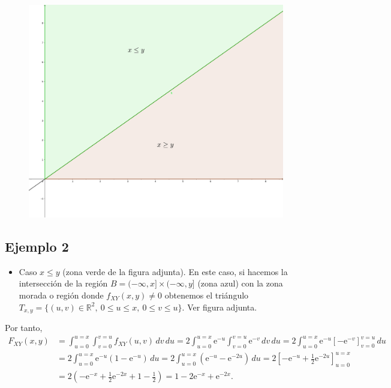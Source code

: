 \documentclass[]{book}
\providecommand{\tightlist}{%
  \setlength{\itemsep}{0pt}\setlength{\parskip}{0pt}}
\begin{document}
\begin{figure}
\includegraphics[width=700px]{Images/Ejemplo2Bidi2} \end{figure}

\hypertarget{ejemplo-2-3}{%
\subsection{Ejemplo 2}\label{ejemplo-2-3}}

\begin{itemize}
\tightlist
\item
  Caso \(x\leq y\) (zona verde de la figura adjunta). En este caso, si hacemos la intersección de la región \(B=(-\infty,x]\times (-\infty,y]\) (zona azul) con la zona morada o región donde \(f_{XY}(x,y)\neq 0\) obtenemos el triángulo \(T_{x,y}=\{(u,v)\in\mathbb{R}^2,\ 0\leq u\leq x,\ 0\leq v\leq u\}.\) Ver figura adjunta.
\end{itemize}

Por tanto,
\[
\begin{array}{rl}
F_{XY}(x,y) & =\int_{u=0}^{u=x}\int_{v=0}^{v=u} f_{XY}(u,v)\,dv\,du= 2 \int_{u=0}^{u=x} \mathrm{e}^{-u}\int_{v=0}^{v=u}  \mathrm{e}^{-v}\,dv\,du  =
2 \int_{u=0}^{u=x} \mathrm{e}^{-u}\left[-\mathrm{e}^{-v}\right]_{v=0}^{v=u}\, du \\ & = 2 \int_{u=0}^{u=x} \mathrm{e}^{-u} (1-\mathrm{e}^{-u})\, du =2 \int_{u=0}^{u=x} \left(\mathrm{e}^{-u}-\mathrm{e}^{-2u}\right)\, du=2 \left[-\mathrm{e}^{-u}+\frac{1}{2}\mathrm{e}^{-2u}\right]_{u=0}^{u=x}  \\ & =
2\left(-\mathrm{e}^{-x}+\frac{1}{2}\mathrm{e}^{-2x}+1-\frac{1}{2}\right) =1-2\mathrm{e}^{-x}+\mathrm{e}^{-2x}.
\end{array}
\]
\end{document}
